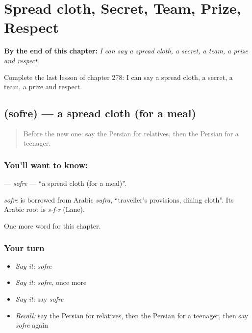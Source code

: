 
\chapter{Spread cloth, Secret, Team, Prize, Respect}
\label{ch:fa-spread-cloth-secret-team-prize-respect}

\begin{chapteropening}
\textbf{By the end of this chapter:} \emph{I can say a spread cloth, a secret, a team, a prize and respect.}

Complete the last lesson of chapter 278: I can say a spread cloth, a secret, a team, a prize and respect.
\end{chapteropening}

\section[\texorpdfstring{\fa{سفره} (sofre)}{سفره (sofre)}]{ (sofre) — a spread cloth (for a meal)}

\label{lesson:FA-C278-sofre}



\begin{quote}
Before the new one: say the Persian for relatives, then the Persian for a teenager.
\end{quote}

\subsection*{You'll want to know: }
\textbf{} — \emph{sofre} — \textquotedblleft{}a spread cloth (for a meal)\textquotedblright{}.

\begin{cousinweb}
\emph{sofre} is borrowed from Arabic \emph{sufra}, \textquotedblleft{}traveller's provisions, dining cloth\textquotedblright{}. Its Arabic root is \emph{s-f-r} (Lane).
\end{cousinweb}

\begin{grammarlens}[title={What you've built}]
One more word for this chapter.
\end{grammarlens}

\subsection*{Your turn}
\begin{itemize}
\raggedright
  \item \emph{Say it:} \emph{sofre}
  \item \emph{Say it:} \emph{sofre}, once more
  \item \emph{Say it:} say \emph{sofre}
  \item \emph{Recall:} say the Persian for relatives, then the Persian for a teenager, then say \emph{sofre} again
\end{itemize}


